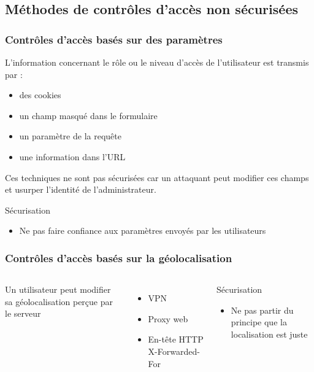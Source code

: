\documentclass[aspectratio=169]{beamer}  %
\begin{document}
\subsection{Méthodes de contrôles d'accès non sécurisées}

\begin{frame}
  \frametitle{Contrôles d'accès basés sur des paramètres}
  L'information concernant le rôle ou le niveau d'accès de l'utilisateur est transmis par :
  \begin{itemize}
    \item des cookies
    \item un champ masqué dans le formulaire
    \item un paramètre de la requête
    \item une information dans l'URL
  \end{itemize}
  \vspace*{1em}
  Ces techniques ne sont pas sécurisées car un attaquant peut modifier ces champs et usurper l'identité de l'administrateur.
  \vspace*{1em}
  \begin{exampleblock}{Sécurisation}
    \begin{itemize}
      \item Ne pas faire confiance aux paramètres envoyés par les utilisateurs
    \end{itemize}
  \end{exampleblock}
\end{frame}


\begin{frame}
  \frametitle{Contrôles d'accès basés sur la géolocalisation}
  \begin{columns}[T]
      Un utilisateur peut modifier sa géolocalisation perçue par le serveur
      \begin{itemize}
        \item VPN
        \item Proxy web
        \item En-tête HTTP X-Forwarded-For
      \end{itemize}
      \begin{exampleblock}{Sécurisation}
        \begin{itemize}
          \item Ne pas partir du principe que la localisation est juste
        \end{itemize}
      \end{exampleblock}
  \end{columns}
\end{frame}
\end{document}
